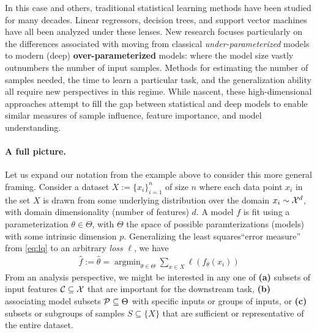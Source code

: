 In this case and others, traditional statistical learning methods 
have been studied 
for many decades.
Linear regressors, decision trees, and support vector machines
have all been analyzed under these lenses.
New research focuses
particularly on the differences
associated with moving from classical \textit{under-parameterized} models to
modern (deep) \textbf{over-parameterized} models: where
the model size vastly outnumbers the number
of input samples.
Methods for estimating the number of samples needed,
the time to learn a particular task,
and the generalization ability 
all require new perspectives in this regime.
While nascent, these high-dimensional approaches
attempt to fill the gap between
statistical and deep models to enable similar measures of sample influence, feature importance, and model understanding. 

\paragraph{A full picture.}
Let us expand our notation from the example above to consider this more general framing.
Consider a dataset $X:=\{x_i\}_{i=1}^n$ of size $n$ where each data point $x_i$ in the set $X$ is drawn from some underlying distribution over the domain $x_i \sim \mathcal{X}^d$, 
with domain dimensionality (number of features) $d$.
A model $f$ is fit using a parameterization $\theta \in \Theta$,
with $\Theta$ the space of possible paramterizations (models) with some intrinsic dimension $p$. 
Generalizing the least squares``error measure'' from \eqref{eq:lq} to an arbitrary \textit{loss} $\ell$, we have
\begin{align}\label{eq:learning}
    \hat{f}:=\hat{\theta} = \mathop{\arg\min}_{\theta\in\Theta} \sum_{x \in X} \ell(f_\theta(x_i))
\end{align}
From an analysis perspective, 
we might be interested in any one of 
\textbf{(a)} subsets of input features $\mathcal{C} \subseteq \mathcal{X}$ that are important for the downstream task,
\textbf{(b)} associating model subsets $\mathcal{P} \subseteq \Theta$ with specific inputs or groups of inputs, or 
\textbf{(c)} subsets or subgroups of samples $S \subseteq \{X\}$ that are sufficient or representative of the entire dataset.

